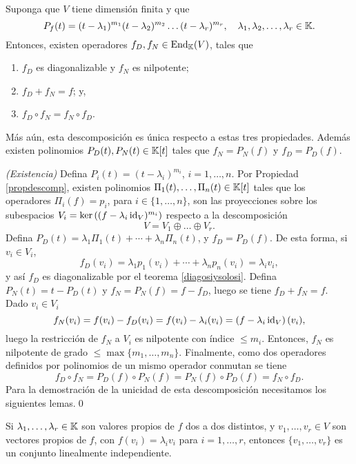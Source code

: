 \begin{teo}\label{descjorche}
  Suponga que $V$ tiene dimensi\'on finita y que
  \[
  P_f(t)=(t-\lambda_1)^{m_1}(t-\lambda_2)^{m_2}\ldots(t-\lambda_r)^{m_r}, \quad \lambda_1,\lambda_2,\ldots,\lambda_r\in \mathbb{K}.
  \]
  Entonces, existen operadores $f_D,f_N\in\operatorname{End}_{\mathbb{K}}(V)$, tales que
  \begin{enumerate}
  \item $f_D$ es diagonalizable y $f_N$ es nilpotente;
  \item $f_D+f_N=f$; y,
  \item $f_D\circ f_N=f_N\circ f_D$.
  \end{enumerate}
  M\'as a\'un, esta descomposici\'on es \'unica respecto a estas tres propiedades. Adem\'as existen polinomios $P_D(t),P_N(t)\in \mathbb{K}[t]$ tales que $f_N=P_N(f)$ y $f_D=P_D(f)$.
\end{teo}
  
  \dem \emph{(Existencia)} Defina $P_i(t)=(t-\lambda_i)^{m_i}$, $i=1,\ldots,n$. Por Propiedad \ref{propdescomp}, existen polinomios $\Pi_1(t),\ldots,\Pi_n(t)\in \mathbb{K}[t]$ tales que los operadores $\Pi_i(f)=p_i$, para $i\in\{1,\ldots,n\}$, son las proyecciones sobre los subespacios $V_i=\ker\left((f-\lambda_i\operatorname{id}_V)^{m_i}\right)$ respecto a la descomposici\'on 
  \[
  V=V_1\oplus \ldots \oplus V_r.
  \]
  Defina $P_D(t)=\lambda_1\Pi_1(t)+\cdots+\lambda_n\Pi_n(t)$, y $f_D=P_D(f)$. De esta forma, si $v_i\in V_i$,
  \[
  f_D(v_i)=\lambda_1p_1(v_i)+\cdots+\lambda_np_n(v_i)=\lambda_iv_i,
  \]
  y as\'i $f_D$ es diagonalizable por el teorema \ref{diagosiysolosi}. Defina $P_N(t)=t-P_D(t)$ y $f_N=P_N(f)=f-f_D$, luego se tiene $f_D+f_N=f$. Dado $v_i\in V_i$
  \[
  f_N(v_i)=f(v_i)-f_D(v_i)=f(v_i)-\lambda_i(v_i)=\left(f-\lambda_i\operatorname{id}_V\right)(v_i),
  \]
  luego la restricci\'on de $f_N$ a $V_i$ es nilpotente con índice $\le m_i$. Entonces, $f_N$ es nilpotente de grado $\le\max\{m_1,\ldots,m_n\}$. Finalmente, como dos operadores definidos por polinomios de un mismo operador conmutan se tiene
  \[
  f_D\circ f_N=P_D(f)\circ P_N(f)=P_N(f)\circ P_D(f)=f_N\circ f_D.
  \]
  Para la demostración de la unicidad de esta descomposición necesitamos los siguientes lemas.\qed

\begin{lema}
Si $\lambda_1,\ldots,\lambda_r\in \mathbb{K}$ son valores propios de $f$ dos a dos distintos, y $v_1,\ldots,v_r\in V$ son vectores propios de $f$, con $f(v_i)=\lambda_iv_i$ para $i=1,\ldots,r$, entonces $\{v_1,\ldots,v_r\}$ es un conjunto linealmente independiente. 
\end{lema}

